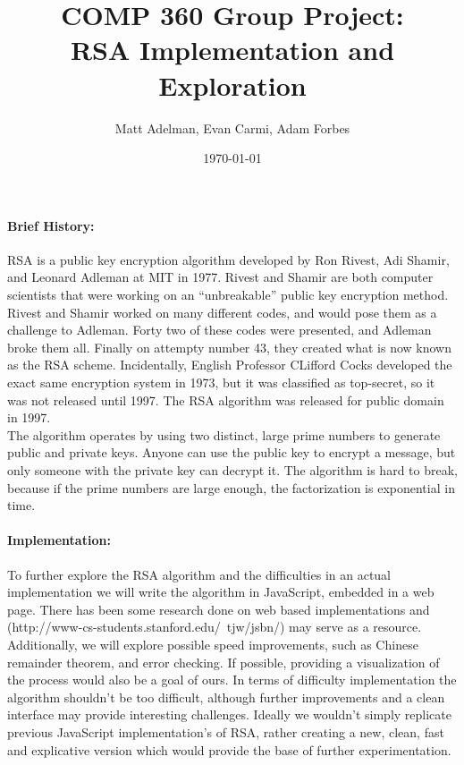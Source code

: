 \documentclass[12pt]{article}
\title{COMP 360 Group Project:\\RSA Implementation and Exploration}
\author{Matt Adelman, Evan Carmi, Adam Forbes}
\date{\today}
\begin{document}
\maketitle

\paragraph{Brief History:\\}
RSA is a public key encryption algorithm developed by Ron Rivest, Adi Shamir, 
and Leonard Adleman at MIT in 1977. Rivest and Shamir are both computer
scientists that were working on an ``unbreakable'' public key encryption method.
Rivest and Shamir worked on many different codes, and would pose them as a
challenge to Adleman. Forty two of these codes were presented, and Adleman broke
them all. Finally on attempty number 43, they created what is now known as the
RSA scheme. Incidentally, English Professor CLifford Cocks developed the exact
same encryption system in 1973, but it was classified as top-secret, so it was
not released until 1997. The RSA algorithm was released for public domain in
1997.\\\indent
The algorithm operates by using two distinct, large prime numbers to generate
public and private keys. Anyone can use the public key to encrypt a message, but
only someone with the private key can decrypt it. The algorithm is hard to
break, because if the prime numbers are large enough, the factorization is
exponential in time.

\paragraph{Implementation:\\}
To further explore the RSA algorithm and the difficulties in an actual 
implementation we will write the algorithm in JavaScript, embedded in a web 
page. There has been some research done on web based implementations and 
(http://www-cs-students.stanford.edu/~tjw/jsbn/) may serve as a resource. 
Additionally, we will explore possible speed improvements, such as Chinese 
remainder theorem, and error checking. If possible, providing a visualization
of the process would also be a goal of ours. In terms of difficulty
implementation the algorithm shouldn't be too difficult, although further 
improvements and a clean interface may provide interesting challenges. Ideally 
we wouldn't simply replicate previous JavaScript implementation's of RSA, 
rather creating a new, clean, fast and explicative version which would provide 
the base of further experimentation.
\end{document}
